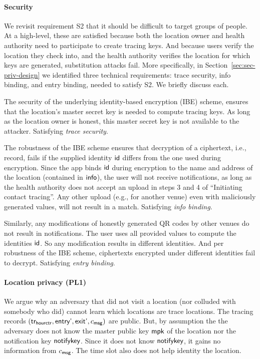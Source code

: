 \paragraph{Security}
We revisit requirement S2 that it should be difficult to target groups of people. At a high-level, these are satisfied because both the location owner and health authority need to participate to create tracing keys. And because users verify the location they check into, and the health authority verifies the location for which keys are generated, substitution attacks fail. More specifically, in Section~\ref{sec:sec-priv-design} we identified three technical requirements: trace security, info binding, and entry binding, needed to satisfy S2. We briefly discuss each.

The security of the underlying identity-based encryption (IBE) scheme, ensures that the location's master secret key is needed to compute tracing keys. As long as the location owner is honest, this master secret key is not available to the attacker. Satisfying \emph{trace security}.

The robustness of the IBE scheme ensures that decryption of a ciphertext, i.e., record, fails if the supplied identity $\textsf{id}$ differs from the one used during encryption. Since the app binds $\textsf{id}$ during encryption to the name and address of the location (contained in $\textsf{info}$), the user will not receive notifications, as long as the health authority does not accept an upload in steps 3 and 4 of ``Initiating contact tracing''. Any other upload (e.g., for another venue) even with maliciously generated values, will not result in a match. Satisfying \emph{info binding}.

Similarly, any modifications of honestly generated QR codes by other venues do not result in notifications. The user uses all provided values to compute the identities $\textsf{id}$. So any modification results in different identities. And per robustness of the IBE scheme, ciphertexts encrypted under different identities fail to decrypt. Satisfying \emph{entry binding}.

\paragraph{Location privacy (PL1)}
We argue why an adversary that did not visit a location (nor colluded with somebody who did) cannot learn which locations are trace locations. The tracing records $(\textsf{tr}_{\textsf{hourctr}}, \textsf{entry'}, \textsf{exit'}, c_{\textsf{msg}})$ are public. But, by assumption the
the adversary does not know the master public key $\textsf{mpk}$ of the location nor the notification key $\textsf{notifykey}$.
Since it does not know $\textsf{notifykey}$, it gains no information from $c_{\textsf{msg}}$. The time slot also does not help identity the location.

